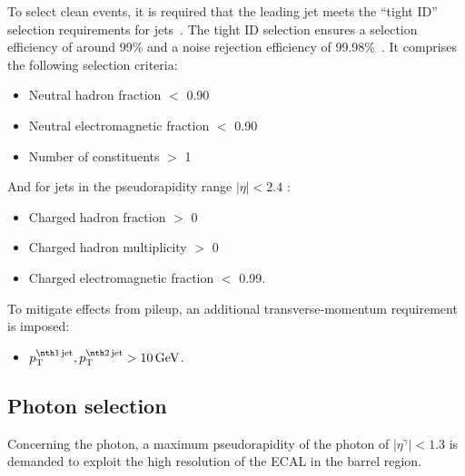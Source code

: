 To select clean \GAMJET events, it is required that the leading jet meets the ``tight ID'' selection requirements for jets~\cite{bib:JetIDRecommendation_7TeV,bib:AN:JetId_8TeV}.
The tight ID selection ensures a selection efficiency of around 99\% and a noise rejection efficiency of 99.98\%~\cite{bib:JetIDRecommendation_7TeV}.
It comprises the following selection criteria:
\begin{itemize}
 \item Neutral hadron fraction $<$ 0.90
 \item Neutral electromagnetic fraction $<$ 0.90
 \item Number of constituents $>$ 1
\end{itemize}
 And for jets in the pseudorapidity range $|\eta| < 2.4 $ :
\begin{itemize}
 \item Charged hadron fraction $>$ 0
 \item Charged hadron multiplicity $>$ 0
 \item Charged electromagnetic fraction $<$ 0.99.
\end{itemize}

To mitigate effects from pileup, an additional transverse-momentum requirement is imposed:
\begin{itemize}
\item $\ptfirstjet,\ptsecondjet>10\gev$.
\end{itemize}

\subsection{Photon selection}
Concerning the photon, a maximum pseudorapidity of the photon of $|\eta^{\gamma}| < 1.3$ is demanded to exploit the high resolution of the ECAL in the barrel region.

